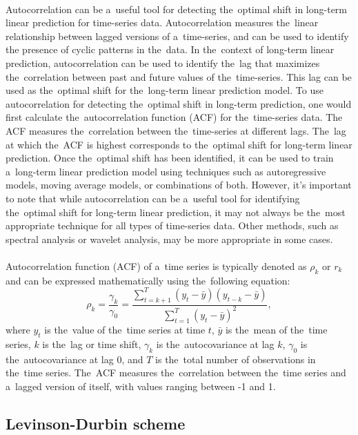 \\
Autocorrelation can be a~useful tool for detecting the~optimal shift in long-term linear prediction for time-series data.
Autocorrelation measures the~linear relationship between lagged versions of a~time-series, and can be used to identify
the presence of cyclic patterns in the~data. In the~context of long-term linear prediction, autocorrelation can be
used to identify the~lag that maximizes the~correlation between past and future values of the~time-series. This lag can
be used as the~optimal shift for the~long-term linear prediction model. To use autocorrelation for detecting the~optimal
shift in long-term prediction, one would first calculate the~autocorrelation function (ACF) for the~time-series data.
The ACF measures the~correlation between the~time-series at different lags. The~lag at which the~ACF is highest
corresponds to the~optimal shift for long-term linear prediction. Once the~optimal shift has been identified, it can
be used to train a~long-term linear prediction model using techniques such as autoregressive models, moving average
models, or combinations of both. However, it's important to note that while autocorrelation can be a~useful tool for
identifying the~optimal shift for long-term linear prediction, it may not always be the~most appropriate technique for
all types of time-series data. Other methods, such as spectral analysis or wavelet analysis, may be more
appropriate in some cases.\\
\\
Autocorrelation function (ACF) of a~time series is typically denoted as $\rho_k$ or $r_k$ and can be expressed
mathematically using the~following equation:
\begin{equation}
    \rho_k = \frac{\gamma_k}{\gamma_0} = \frac{\sum_{t=k+1}^{T}(y_t - \bar{y})(y_{t-k} - \bar{y})}{\sum_{t=1}^{T}(y_t - \bar{y})^2},
\end{equation}
where $y_t$ is the~value of the~time series at time $t$, $\bar{y}$ is the~mean of the~time series, $k$ is the~lag or
time shift, $\gamma_k$ is the~autocovariance at lag $k$, $\gamma_0$ is the~autocovariance at lag 0, and $T$ is the~total number
of observations in the~time series. The~ACF measures the~correlation between the~time series and a~lagged version of
itself, with values ranging between -1 and 1.

\subsection{Levinson-Durbin scheme} \label{subsec:levinson}

